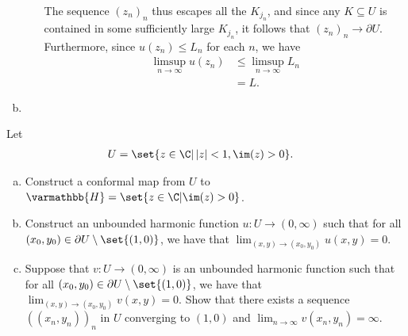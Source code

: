 \documentclass[10pt]{mypackage}
\renewcommand*{\mathbb}[1]{\varmathbb{#1}}
\begin{document}
\begin{solution}
\begin{enumerate}[(a)]
\begin{enumerate}[(i)]
          The sequence $\left( z_n \right)_n$ thus escapes all the $K_{j_n}$, and since any $K\subseteq U$ is contained in some sufficiently large $K_{j_n}$, it follows that $\left( z_n \right)_n\rightarrow \partial U$. Furthermore, since $u\left( z_n \right)\leq L_n$ for each $n$, we have
          \begin{align*}
            \limsup_{n\rightarrow\infty} u\left( z_n \right) &\leq \limsup_{n\rightarrow\infty}L_n\\
                                                             &= L.
          \end{align*}
      \end{enumerate}
    \item 
  \end{enumerate}
\end{solution}
\begin{problem}[Problem 2]
  Let
  \begin{align*}
    U &= \set{z\in \C | \left\vert z \right\vert < 1,\im(z) > 0}.
  \end{align*}
  \begin{enumerate}[(a)]
    \item Construct a conformal map from $U$ to $ \mathbb{H} = \set{z\in\C | \im(z) > 0} $.
    \item Construct an unbounded harmonic function $u\colon U\rightarrow (0,\infty)$ such that for all $\left( x_0,y_0 \right)\in \partial U \setminus \set{(1,0)}$, we have that $\lim_{\left( x,y \right)\rightarrow \left( x_0,y_0 \right)} u\left( x,y \right) = 0$.
    \item Suppose that $v\colon U\rightarrow (0,\infty)$ is an unbounded harmonic function such that for all $\left( x_0,y_0 \right)\in \partial U\setminus \set{\left( 1,0 \right)}$, we have that $\lim_{\left( x,y \right)\rightarrow \left( x_0,y_0 \right)} v\left( x,y \right) = 0$. Show that there exists a sequence $\left( \left( x_n,y_n \right) \right)_n$ in $U$ converging to $\left( 1,0 \right)$ and $\lim_{n\rightarrow\infty}v\left( x_n,y_n \right) = \infty$.
  \end{enumerate}
\end{problem}
\end{document}
